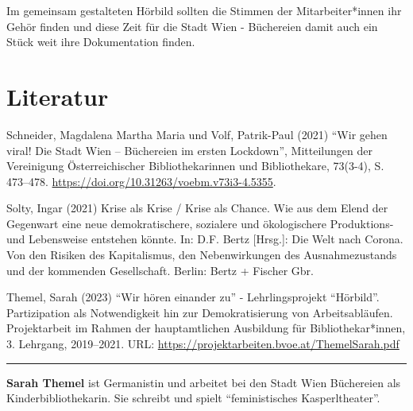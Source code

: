 \documentclass[a4paper,
fontsize=11pt,
oneside,
numbers=noperiodatend,
parskip=half-,
bibliography=totoc,
final
]{scrartcl}
\begin{document}
Im gemeinsam gestalteten Hörbild sollten die Stimmen der
Mitarbeiter*innen ihr Gehör finden und diese Zeit für die Stadt Wien -
Büchereien damit auch ein Stück weit ihre Dokumentation finden.

\hypertarget{literatur}{%
\section{Literatur}\label{literatur}}

Schneider, Magdalena Martha Maria und Volf, Patrik-Paul (2021)
\enquote{Wir gehen viral! Die Stadt Wien -- Büchereien im ersten
Lockdown}, Mitteilungen der Vereinigung Österreichischer
Bibliothekarinnen und Bibliothekare, 73(3-4), S. 473--478.
\url{https://doi.org/10.31263/voebm.v73i3-4.5355}.

Solty, Ingar (2021) Krise als Krise / Krise als Chance. Wie aus dem
Elend der Gegenwart eine neue demokratischere, sozialere und
ökologischere Produktions- und Lebensweise entstehen könnte. In: D.F.
Bertz {[}Hrsg.{]}: Die Welt nach Corona. Von den Risiken des
Kapitalismus, den Nebenwirkungen des Ausnahmezustands und der kommenden
Gesellschaft. Berlin: Bertz + Fischer Gbr.

Themel, Sarah (2023) \enquote{Wir hören einander zu} - Lehrlingsprojekt
\enquote{Hörbild}. Partizipation als Notwendigkeit hin zur
Demokratisierung von Arbeitsabläufen. Projektarbeit im Rahmen der
hauptamtlichen Ausbildung für Bibliothekar*innen, 3. Lehrgang,
2019--2021. URL: \url{https://projektarbeiten.bvoe.at/ThemelSarah.pdf}

\begin{center}\rule{0.5\linewidth}{0.5pt}\end{center}

\textbf{Sarah Themel} ist Germanistin und arbeitet bei den Stadt Wien
Büchereien als Kinderbibliothekarin. Sie schreibt und spielt
``feministisches Kasperltheater''.
\end{document}
